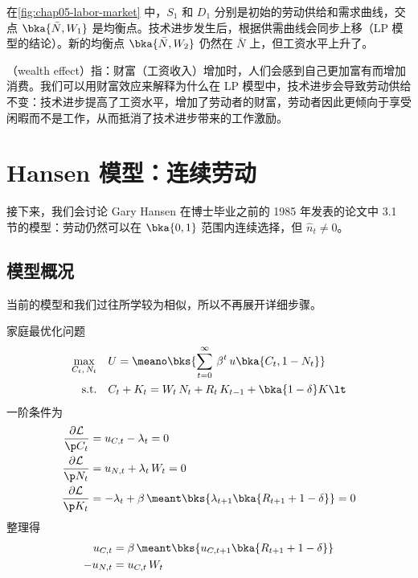 在\ref{fig:chap05-labor-market} 中，\(S_1\) 和 \(D_1\) 分别是初始的劳动供给和需求曲线，交点 \(\bka{\bar N, W_1}\) 是均衡点。技术进步发生后，根据供需曲线会同步上移（LP 模型的结论）。新的均衡点 \(\bka{\bar N, W_2}\) 仍然在 \(\bar N\) 上，但工资水平上升了。

（wealth effect）指：财富（工资收入）增加时，人们会感到自己更加富有而增加消费。我们可以用财富效应来解释为什么在 LP 模型中，技术进步会导致劳动供给不变：技术进步提高了工资水平，增加了劳动者的财富，劳动者因此更倾向于享受闲暇而不是工作，从而抵消了技术进步带来的工作激励。

\section{Hansen 模型：连续劳动}\label{sec:hansen-continuous-labor}

接下来，我们会讨论 Gary Hansen 在博士毕业之前的 1985 年发表的论文中 3.1 节的模型：劳动仍然可以在 \(\bka{0,1}\) 范围内连续选择，但 \(\hat n_t\ne0\)。


\subsection{模型概况}\label{sec:hansen-continuous-labor-model}

当前的模型和我们过往所学较为相似，所以不再展开详细步骤。

家庭最优化问题
\begin{align*}
    \max_{C_t,\,N_t}\quad & U=\meano\bks{\sum^\infty_{t=0}\,\beta^t\,u\bka{C_t,1-N_t}}\\
    \text{s.t.}\quad & C_t+K_t=W_t\,N_t+R_t\,K_{t-1}+\bka{1-\delta}K\lt
\end{align*}
一阶条件为
\begin{align*}
    \frac{\partial\mathcal{L}}{\p C_t}&=u_{C,t}-\lambda_t=0\\
    \frac{\partial\mathcal{L}}{\p N_t}&=u_{N,t}+\lambda_t\,W_t=0\\
    \frac{\partial\mathcal{L}}{\p K_t}&=-\lambda_t+\beta\,\meant\bks{\lambda_{t+1}\bka{R_{t+1}+1-\delta}}=0
\end{align*}
整理得
\begin{align*}
    u_{C,t}&=\beta\,\meant\bks{u_{C,t+1}\bka{R_{t+1}+1-\delta}}\\
    -u_{N,t}&=u_{C,t}\,W_t
\end{align*}

